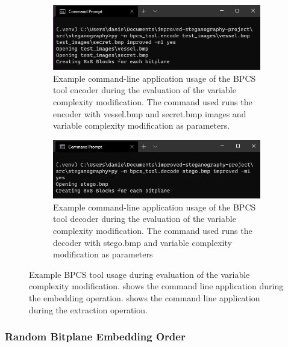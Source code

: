 \documentclass{l4proj}
\begin{document}
\begin{appendices}
\begin{figure}
    \centering
    \begin{subfigure}[b]{0.75\textwidth}
        \includegraphics[width=\textwidth]{images/vc_terminal_encode.png}
        \caption{Example command-line application usage of the BPCS tool encoder during the evaluation of the variable complexity modification. The command used runs the encoder with vessel.bmp and secret.bmp images and variable complexity modification as parameters.}
        \label{fig:vc_encode_terminal}
    \end{subfigure}
    \begin{subfigure}[b]{0.75\textwidth}
        \includegraphics[width=\textwidth]{images/vc_terminal_decode.png}
        \caption{Example command-line application usage of the BPCS tool decoder during the evaluation of the variable complexity modification. The command used runs the decoder with stego.bmp and variable complexity modification as parameters}
        \label{fig:vc_decode_terminal}
    \end{subfigure}
    \caption{Example BPCS tool usage during evaluation of the variable complexity modification.  shows the command line application during the embedding operation.  shows the command line application during the extraction operation.}
\end{figure}

\subsubsection{Random Bitplane Embedding Order}


\end{appendices}
\end{document}
